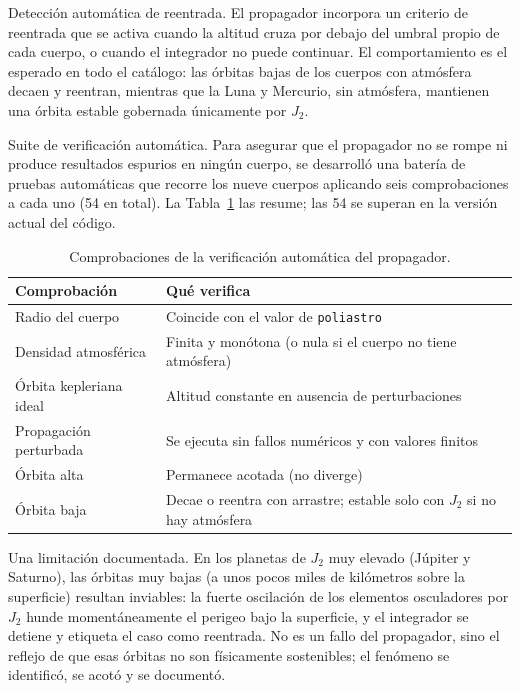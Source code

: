 Detección automática de reentrada. El propagador incorpora un criterio de reentrada que se activa cuando la altitud cruza por debajo del umbral propio de cada cuerpo, o cuando el integrador no puede continuar. El comportamiento es el esperado en todo el catálogo: las órbitas bajas de los cuerpos con atmósfera decaen y reentran, mientras que la Luna y Mercurio, sin atmósfera, mantienen una órbita estable gobernada únicamente por $J_2$.

Suite de verificación automática. Para asegurar que el propagador no se rompe ni produce resultados espurios en ningún cuerpo, se desarrolló una batería de pruebas automáticas que recorre los nueve cuerpos aplicando seis comprobaciones a cada uno (54 en total). La Tabla~\ref{tab:res-tests} las resume; las 54 se superan en la versión actual del código.

\begin{table}[htbp]
  \centering
  \caption{Comprobaciones de la verificación automática del propagador.}
  \label{tab:res-tests}
  \begin{tabular}{l p{8.2cm}}
    \hline
    \textbf{Comprobación} & \textbf{Qué verifica} \\
    \hline
    Radio del cuerpo         & Coincide con el valor de \texttt{poliastro} \\
    Densidad atmosférica     & Finita y monótona (o nula si el cuerpo no tiene atmósfera) \\
    Órbita kepleriana ideal  & Altitud constante en ausencia de perturbaciones \\
    Propagación perturbada   & Se ejecuta sin fallos numéricos y con valores finitos \\
    Órbita alta              & Permanece acotada (no diverge) \\
    Órbita baja              & Decae o reentra con arrastre; estable solo con $J_2$ si no hay atmósfera \\
    \hline
  \end{tabular}
\end{table}

Una limitación documentada. En los planetas de $J_2$ muy elevado (Júpiter y Saturno), las órbitas muy bajas (a unos pocos miles de kilómetros sobre la superficie) resultan inviables: la fuerte oscilación de los elementos osculadores por $J_2$ hunde momentáneamente el perigeo bajo la superficie, y el integrador se detiene y etiqueta el caso como reentrada. No es un fallo del propagador, sino el reflejo de que esas órbitas no son físicamente sostenibles; el fenómeno se identificó, se acotó y se documentó.

